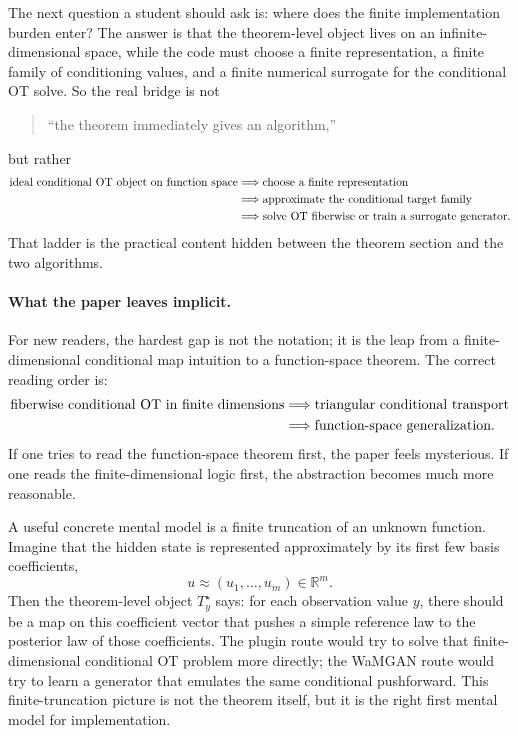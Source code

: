 \documentclass[11pt]{report}
\newcommand{\R}{\mathbb{R}}
\begin{document}
The next question a student should ask is: where does the finite implementation
burden enter?  The answer is that the theorem-level object lives on an infinite-
dimensional space, while the code must choose a finite representation, a finite
family of conditioning values, and a finite numerical surrogate for the conditional
OT solve.  So the real bridge is not
\begin{quote}
``the theorem immediately gives an algorithm,''
\end{quote}
but rather
\begin{align}
\text{ideal conditional OT object on function space}
&\Longrightarrow
\text{choose a finite representation}
\notag\\
&\Longrightarrow
\text{approximate the conditional target family}
\notag\\
&\Longrightarrow
\text{solve OT fiberwise or train a surrogate generator}.
\label{eq:hosseini-finite-bridge}
\end{align}
That ladder is the practical content hidden between the theorem section and the two
algorithms.

\paragraph{What the paper leaves implicit.}
For new readers, the hardest gap is not the notation; it is the leap from a
finite-dimensional conditional map intuition to a function-space theorem.  The
correct reading order is:
\begin{align}
\text{fiberwise conditional OT in finite dimensions}
&\Longrightarrow
\text{triangular conditional transport}
\notag\\
&\Longrightarrow
\text{function-space generalization}.
\label{eq:hosseini-reading-order}
\end{align}
If one tries to read the function-space theorem first, the paper feels mysterious.
If one reads the finite-dimensional logic first, the abstraction becomes much more
reasonable.

A useful concrete mental model is a finite truncation of an unknown function.
Imagine that the hidden state is represented approximately by its first few basis
coefficients,
\begin{equation}
u \approx (u_1,\ldots,u_m) \in \R^m.
\label{eq:hosseini-finite-truncation-idea}
\end{equation}
Then the theorem-level object $T_y^\star$ says: for each observation value $y$,
there should be a map on this coefficient vector that pushes a simple reference law
to the posterior law of those coefficients.  The plugin route would try to solve
that finite-dimensional conditional OT problem more directly; the WaMGAN route
would try to learn a generator that emulates the same conditional pushforward.
This finite-truncation picture is not the theorem itself, but it is the right first
mental model for implementation.
\end{document}
